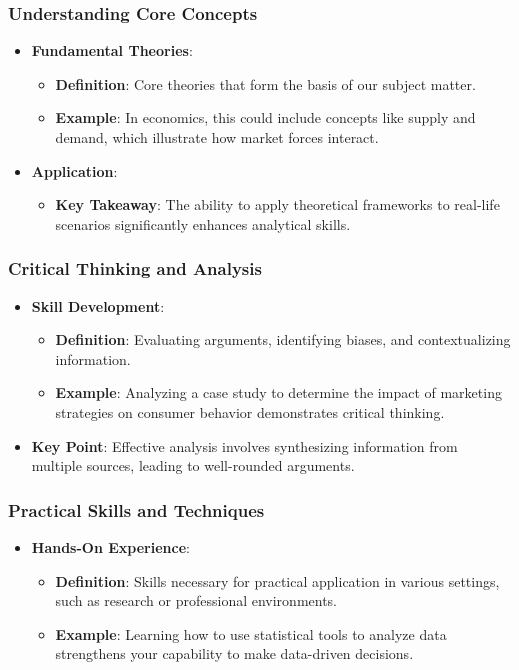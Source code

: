 \documentclass[aspectratio=169]{beamer}
\begin{document}
\begin{frame}[fragile]
    \frametitle{Understanding Core Concepts}
    \begin{itemize}
        \item \textbf{Fundamental Theories}:
        \begin{itemize}
            \item \textbf{Definition}: Core theories that form the basis of our subject matter.
            \item \textbf{Example}: In economics, this could include concepts like supply and demand, which illustrate how market forces interact.
        \end{itemize}
        \item \textbf{Application}:
        \begin{itemize}
            \item \textbf{Key Takeaway}: The ability to apply theoretical frameworks to real-life scenarios significantly enhances analytical skills.
        \end{itemize}
    \end{itemize}
\end{frame}

\begin{frame}[fragile]
    \frametitle{Critical Thinking and Analysis}
    \begin{itemize}
        \item \textbf{Skill Development}:
        \begin{itemize}
            \item \textbf{Definition}: Evaluating arguments, identifying biases, and contextualizing information.
            \item \textbf{Example}: Analyzing a case study to determine the impact of marketing strategies on consumer behavior demonstrates critical thinking.
        \end{itemize}
        \item \textbf{Key Point}: Effective analysis involves synthesizing information from multiple sources, leading to well-rounded arguments.
    \end{itemize}
\end{frame}

\begin{frame}[fragile]
    \frametitle{Practical Skills and Techniques}
    \begin{itemize}
        \item \textbf{Hands-On Experience}:
        \begin{itemize}
            \item \textbf{Definition}: Skills necessary for practical application in various settings, such as research or professional environments.
            \item \textbf{Example}: Learning how to use statistical tools to analyze data strengthens your capability to make data-driven decisions.
        \end{itemize}
    \end{itemize}
\end{frame}
\end{document}
